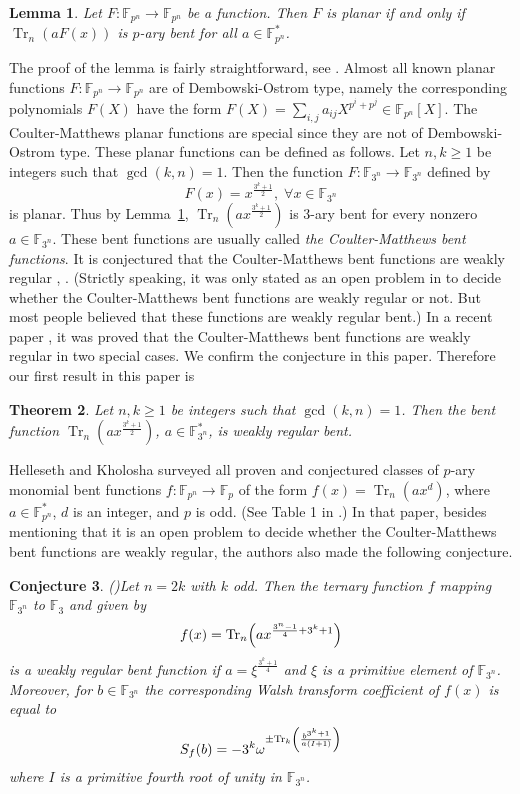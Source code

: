 \documentclass[11pt, reqno]{amsart}
\newtheorem{teor}{Theorem}[section]
\newtheorem{lem}[teor]{Lemma}
\newtheorem{con}[teor]{Conjecture}
\newcommand{\Ff}{{\mathbb F}}
\def\Tr{\operatorname{Tr}}
\def\Tr{\operatorname{Tr}}
\begin{document}
\begin{lem}\label{planarbent}
Let $F:\Ff_{p^n}\rightarrow\Ff_{p^n}$ be a function. Then $F$ is
planar if and only if $\Tr_n(aF(x))$ is $p$-ary bent for all $a\in
\Ff_{p^n}^*$.
\end{lem}

The proof of the lemma is fairly straightforward, see
\cite{carletd}. Almost all known planar functions
$F:\Ff_{p^n}\rightarrow\Ff_{p^n}$ are of Dembowski-Ostrom type,
namely the corresponding polynomials $F(X)$ have the form
$F(X)=\sum_{i,j}a_{ij}X^{p^i+p^j}\in \Ff_{p^n}[X]$. The
Coulter-Matthews planar functions are special since they are not of
Dembowski-Ostrom type. These planar functions can be defined as
follows. Let $n,k\geq 1$ be integers such that $\gcd(k,n)=1$. Then
the function $F: \Ff_{3^n}\rightarrow \Ff_{3^n}$ defined by
$$F(x)=x^{\frac {3^k +1} {2}},\;\forall x\in \Ff_{3^n}$$
is planar. Thus by Lemma~\ref{planarbent}, $\Tr_n(ax^{\frac {3^k +1}
{2}})$ is $3$-ary bent for every nonzero $a\in\Ff_{3^n}$. These bent
functions are usually called {\it the Coulter-Matthews bent
functions}. It is conjectured that the Coulter-Matthews bent
functions are weakly regular \cite{hk1}, \cite{newhou}. (Strictly
speaking, it was only stated as an open problem in \cite{hk1} to
decide whether the Coulter-Matthews bent functions are weakly
regular or not. But most people believed that these functions are
weakly regular bent.) In a recent paper \cite{newhou}, it was proved
that the Coulter-Matthews bent functions are weakly regular in two
special cases. We confirm the conjecture in this paper. Therefore
our first result in this paper is

\begin{teor}\label{minor}
Let $n,k\geq 1$ be integers such that $\gcd(k,n)=1$. Then the bent
function $\Tr_n(ax^{\frac {3^k +1} {2}})$, $a\in \Ff_{3^n}^*$, is
weakly regular bent.
\end{teor}

Helleseth and Kholosha \cite{hk1} surveyed all proven and
conjectured classes of $p$-ary monomial bent functions
$f:\Ff_{p^n}\rightarrow \Ff_p$ of the form $f(x)=\Tr_n(ax^d)$, where
$a\in\Ff_{p^n}^*$, $d$ is an integer, and $p$ is odd. (See Table 1
in \cite{hk1}.) In that paper, besides mentioning that it is an open
problem to decide whether the Coulter-Matthews bent functions are
weakly regular, the authors also made the following conjecture.

\begin{con} {\rm (\cite{hk1})}\label{hk}
Let $n=2k$ with $k$ odd. Then the ternary function $f$ mapping
$\Ff_{3^n}$ to $\Ff_3$ and given by
\[f(x)={\rm
Tr}_n\Big(ax^{\frac{3^n-1}{4}+3^k+1}\Big)\] is a weakly regular bent
function if $a=\xi^{\frac{3^k+1}{4}}$ and $\xi$ is a primitive
element of $\Ff_{3^n}$. Moreover, for $b\in\Ff_{3^n}$ the
corresponding Walsh transform coefficient of $f(x)$ is equal to
\[S_f(b)=-3^k\omega^{\pm{\rm
Tr}_k\left(\frac{b^{3^k+1}}{a(I+1)}\right)}\] where $I$ is a
primitive fourth root of unity in $\Ff_{3^n}$.
\end{con}
\end{document}
